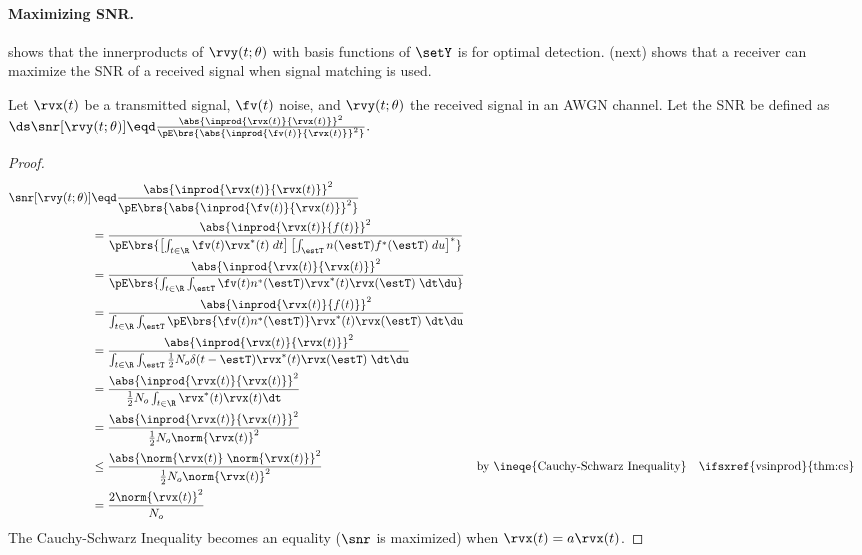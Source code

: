 \paragraph{Maximizing SNR.}
 shows that the innerproducts of $\rvy(t;\theta)$ with
basis functions of $\setY$ is  for optimal detection.
 (next) shows that a receiver can
maximize the SNR of a received signal when signal matching is used.

\begin{theorem}
\label{thm:mf_maxSNR}
Let $\rvx(t)$ be a transmitted signal, $\fv(t)$ noise, and $\rvy(t;\theta)$ the received signal
in an AWGN channel.
Let the  SNR be defined as
\\\indentx$\ds
      \snr[\rvy(t;\theta)] \eqd \frac{\abs{\inprod{\rvx(t)}{\rvx(t)}}^2}
                            {\pE\brs{\abs{\inprod{\fv(t)}{\rvx(t)}}^2}}.
          $
\end{theorem}

\begin{proof}
\begin{align*}
   \snr[\rvy(t;\theta)]
     &\eqd \frac{\abs{\inprod{\rvx(t)}{\rvx(t)}}^2}
                {\pE\brs{\abs{\inprod{\fv(t)}{\rvx(t)}}^2}}
   \\&=    \frac{\abs{\inprod{\rvx(t)}{f(t)}}^2}
                {\pE\brs{\left[\int_{t\in\R} \fv(t)\rvx^\ast(t)\;dt\right]
                      \left[\int_{\estT} n(\estT)f^\ast(\estT)\;du\right]^\ast}
                }
   \\&=    \frac{\abs{\inprod{\rvx(t)}{\rvx(t)}}^2}
                {\pE\brs{\int_{t\in\R} \int_{\estT} \fv(t)n^\ast(\estT)\rvx^\ast(t)\rvx(\estT)\;\dt\du}}
   \\&=    \frac{\abs{\inprod{\rvx(t)}{f(t)}}^2}
                {\int_{t\in\R} \int_{\estT} \pE\brs{\fv(t)n^\ast(\estT)}\rvx^\ast(t)\rvx(\estT)\;\dt\du}
   \\&=    \frac{\abs{\inprod{\rvx(t)}{\rvx(t)}}^2}
                {\int_{t\in\R} \int_{\estT} \frac{1}{2}N_o\delta(t-\estT) \rvx^\ast(t)\rvx(\estT)\;\dt\du}
   \\&=    \frac{\abs{\inprod{\rvx(t)}{\rvx(t)}}^2}
                {\frac{1}{2}N_o \int_{t\in\R} \rvx^\ast(t)\rvx(t)\dt}
   \\&=    \frac{\abs{\inprod{\rvx(t)}{\rvx(t)}}^2}
                {\frac{1}{2}N_o \norm{\rvx(t)}^2}
   \\&\le  \frac{\abs{\norm{\rvx(t)}\;\norm{\rvx(t)}}^2}
                {\frac{1}{2}N_o \norm{\rvx(t)}^2}
     &&    \text{by \ineqe{Cauchy-Schwarz Inequality}}
     &&    \text{\ifsxref{vsinprod}{thm:cs}}
   \\&=    \frac{2\norm{\rvx(t)}^2}
                {N_o }
\end{align*}
The Cauchy-Schwarz Inequality becomes an equality
($\snr$ is maximized) when $\rvx(t)=a\rvx(t)$.
\end{proof}

